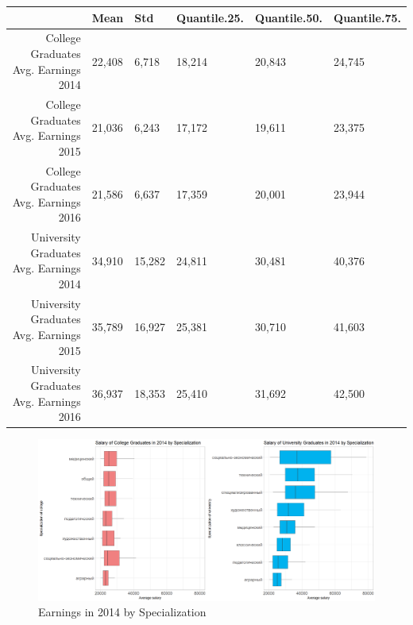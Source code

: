 \documentclass[alpha-refs]{wiley-article-05g}
\begin{document}
\begin{table}[htbp!]
	\centering
	\begin{tabular}{rlllll}
		\hline
		& Mean & Std & Quantile.25. & Quantile.50. & Quantile.75. \\ 
		\hline
		College Graduates Avg. Earnings 2014 & 22,408 & 6,718 & 18,214 & 20,843 & 24,745 \\ 
		College Graduates Avg. Earnings 2015 & 21,036 & 6,243 & 17,172 & 19,611 & 23,375 \\ 
		College Graduates Avg. Earnings 2016 & 21,586 & 6,637 & 17,359 & 20,001 & 23,944 \\ 
		University Graduates Avg. Earnings 2014 & 34,910 & 15,282 & 24,811 & 30,481 & 40,376 \\ 
		University Graduates Avg. Earnings 2015 & 35,789 & 16,927 & 25,381 & 30,710 & 41,603 \\ 
		University Graduates Avg. Earnings 2016 & 36,937 & 18,353 & 25,410 & 31,692 & 42,500 \\ 
		\hline
	\end{tabular}
\end{table}



\begin{figure}[H]
	\centering
	\includegraphics[width=400pt]{box_plot1a.png}
	\caption{Earnings in 2014 by Specialization}\label{fig:1.1}
\end{figure}

\newpage
\end{document}
